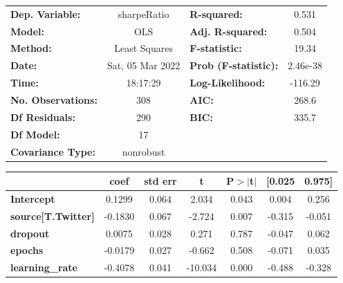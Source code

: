 \begin{center}
\begin{tabular}{lclc}
\toprule
\textbf{Dep. Variable:}                   &   sharpeRatio    & \textbf{  R-squared:         } &     0.531   \\
\textbf{Model:}                           &       OLS        & \textbf{  Adj. R-squared:    } &     0.504   \\
\textbf{Method:}                          &  Least Squares   & \textbf{  F-statistic:       } &     19.34   \\
\textbf{Date:}                            & Sat, 05 Mar 2022 & \textbf{  Prob (F-statistic):} &  2.46e-38   \\
\textbf{Time:}                            &     18:17:29     & \textbf{  Log-Likelihood:    } &   -116.29   \\
\textbf{No. Observations:}                &         308      & \textbf{  AIC:               } &     268.6   \\
\textbf{Df Residuals:}                    &         290      & \textbf{  BIC:               } &     335.7   \\
\textbf{Df Model:}                        &          17      & \textbf{                     } &             \\
\textbf{Covariance Type:}                 &    nonrobust     & \textbf{                     } &             \\
\bottomrule
\end{tabular}
\begin{tabular}{lcccccc}
                                          & \textbf{coef} & \textbf{std err} & \textbf{t} & \textbf{P$> |$t$|$} & \textbf{[0.025} & \textbf{0.975]}  \\
\midrule
\textbf{Intercept}                        &       0.1299  &        0.064     &     2.034  &         0.043        &        0.004    &        0.256     \\
\textbf{source[T.Twitter]}                &      -0.1830  &        0.067     &    -2.724  &         0.007        &       -0.315    &       -0.051     \\
\textbf{dropout}                          &       0.0075  &        0.028     &     0.271  &         0.787        &       -0.047    &        0.062     \\
\textbf{epochs}                           &      -0.0179  &        0.027     &    -0.662  &         0.508        &       -0.071    &        0.035     \\
\textbf{learning\_rate}                   &      -0.4078  &        0.041     &   -10.034  &         0.000        &       -0.488    &       -0.328     \\

\end{tabular}
\end{center}
